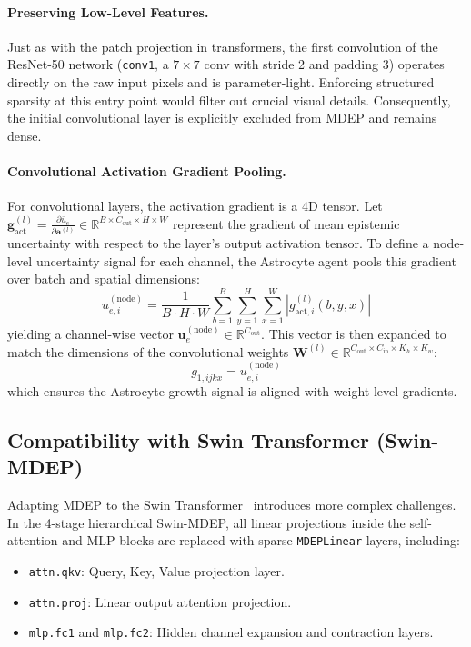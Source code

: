 \documentclass[letterpaper]{article} %
\newcommand{\R}{\mathbb{R}}
\begin{document}
\paragraph{Preserving Low-Level Features.}
Just as with the patch projection in transformers, the first convolution of the ResNet-50 network (\texttt{conv1}, a $7 \times 7$ conv with stride 2 and padding 3) operates directly on the raw input pixels and is parameter-light. Enforcing structured sparsity at this entry point would filter out crucial visual details. Consequently, the initial convolutional layer is explicitly excluded from MDEP and remains dense.

\paragraph{Convolutional Activation Gradient Pooling.}
For convolutional layers, the activation gradient is a 4D tensor. Let $\bm{g}_{\text{act}}^{(l)} = \frac{\partial \bar{u}_e}{\partial \bm{a}^{(l)}} \in \R^{B \times C_{\text{out}} \times H \times W}$ represent the gradient of mean epistemic uncertainty with respect to the layer's output activation tensor. To define a node-level uncertainty signal for each channel, the Astrocyte agent pools this gradient over batch and spatial dimensions:
\begin{equation}\label{eq:conv_pooling}
    u_{e,i}^{(\text{node})} = \frac{1}{B \cdot H \cdot W} \sum_{b=1}^B \sum_{y=1}^H \sum_{x=1}^W \left| g_{\text{act}, i}^{(l)}(b, y, x) \right|
\end{equation}
yielding a channel-wise vector $\bm{u}_e^{(\text{node})} \in \R^{C_{\text{out}}}$. This vector is then expanded to match the dimensions of the convolutional weights $\bm{W}^{(l)} \in \R^{C_{\text{out}} \times C_{\text{in}} \times K_h \times K_w}$:
\begin{equation}
    g_{1, ijkx} = u_{e,i}^{(\text{node})}
\end{equation}
which ensures the Astrocyte growth signal is aligned with weight-level gradients.

\subsection{Compatibility with Swin Transformer (Swin-MDEP)}\label{subsec:swin}

Adapting MDEP to the Swin Transformer~\cite{liu2021swin, liu2022swinv2} introduces more complex challenges. In the 4-stage hierarchical Swin-MDEP, all linear projections inside the self-attention and MLP blocks are replaced with sparse \texttt{MDEPLinear} layers, including:
\begin{itemize}
    \item \texttt{attn.qkv}: Query, Key, Value projection layer.
    \item \texttt{attn.proj}: Linear output attention projection.
    \item \texttt{mlp.fc1} and \texttt{mlp.fc2}: Hidden channel expansion and contraction layers.
\end{itemize}
\end{document}
